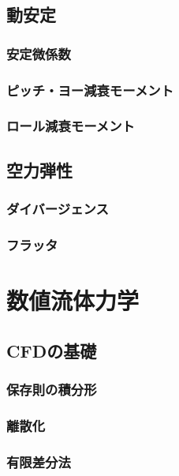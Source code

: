 \documentclass[uplatex,dvipdfmx,a4j,11pt]{jsreport}
\numberwithin{equation}{chapter}
\begin{document}
\section{動安定}

\subsection{安定微係数}

\subsection{ピッチ・ヨー減衰モーメント}

\subsection{ロール減衰モーメント}

\section{空力弾性}

\subsection{ダイバージェンス}

\subsection{フラッタ}



\chapter{数値流体力学}

\section{CFDの基礎}

\subsection{保存則の積分形}

\subsection{離散化}

\subsection{有限差分法}
\end{document}
